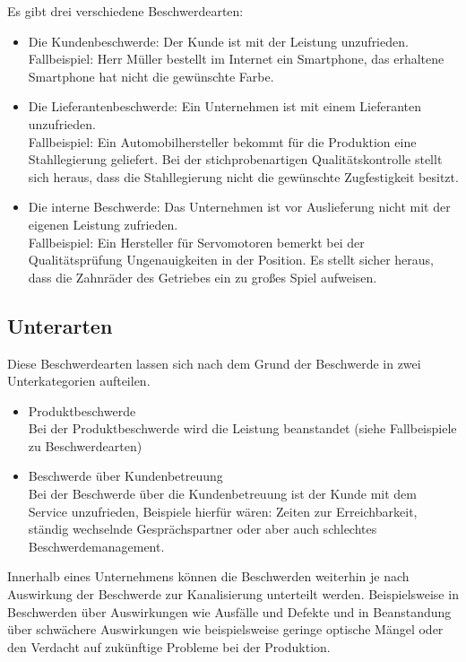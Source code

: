 \documentclass[a4paper,12pt]{article}
\begin{document}
	Es gibt drei verschiedene Beschwerdearten:
	
	\begin{itemize}
		\item Die Kundenbeschwerde: Der Kunde ist mit der Leistung unzufrieden. \\
		Fallbeispiel: Herr Müller bestellt im Internet ein Smartphone, das erhaltene Smartphone hat nicht die gewünschte Farbe.
		\item Die Lieferantenbeschwerde: Ein Unternehmen ist mit einem Lieferanten unzufrieden. \\
		Fallbeispiel: Ein Automobilhersteller bekommt für die Produktion eine Stahllegierung geliefert. Bei der stichprobenartigen Qualitätskontrolle stellt sich heraus, dass die Stahllegierung nicht die gewünschte Zugfestigkeit besitzt.
		\item Die interne Beschwerde: Das Unternehmen ist vor Auslieferung nicht mit der eigenen Leistung zufrieden. \\
		Fallbeispiel: Ein Hersteller für Servomotoren bemerkt bei der Qualitätsprüfung Ungenauigkeiten in der Position. Es stellt sicher heraus, dass die Zahnräder des Getriebes ein zu großes Spiel aufweisen.
	\end{itemize}\newpage
	\subsection{Unterarten}
	Diese Beschwerdearten lassen sich nach dem Grund der Beschwerde in zwei Unterkategorien aufteilen.
	\begin{itemize}
		\item Produktbeschwerde \\
		Bei der Produktbeschwerde wird die Leistung beanstandet (siehe Fallbeispiele zu Beschwerdearten)
		\item Beschwerde über Kundenbetreuung \\
		Bei der Beschwerde über die Kundenbetreuung ist der Kunde mit dem Service unzufrieden, Beispiele hierfür wären: Zeiten zur Erreichbarkeit, ständig wechselnde Gesprächspartner oder aber auch schlechtes Beschwerdemanagement.
	\end{itemize}
	Innerhalb eines Unternehmens können die Beschwerden weiterhin je nach Auswirkung der Beschwerde zur Kanalisierung unterteilt werden.
	Beispielsweise in Beschwerden über Auswirkungen wie Ausfälle und Defekte und in Beanstandung über schwächere Auswirkungen wie beispielsweise geringe optische Mängel oder den Verdacht auf zukünftige Probleme bei der Produktion.
\end{document}
